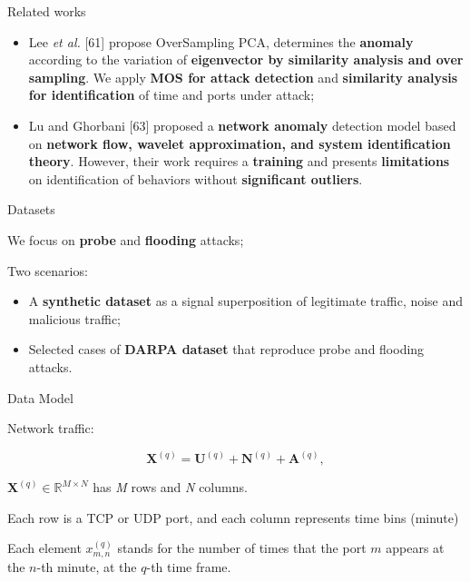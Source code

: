 \documentclass[newPxFont, numfooter, sectionpages]{beamer}
\begin{document}
\begin{frame}[c]{Related works}
	
	\begin{itemize}
		\item Lee \emph{et al.} [61] propose OverSampling PCA, determines the \textbf{anomaly} according to the variation of \textbf{eigenvector by similarity analysis and over sampling}. We apply \textbf{MOS for attack detection} and \textbf{similarity analysis for identification} of time and ports under attack;
		\item Lu and Ghorbani [63] proposed a \textbf{network anomaly} detection model based on \textbf{network flow, wavelet approximation, and system identification theory}. However, their work requires a \textbf{training} and presents \textbf{limitations} on identification of behaviors without \textbf{significant outliers}.
	\end{itemize}
	
\end{frame}
\begin{frame}{Datasets}
	
	We focus on \textbf{probe} and \textbf{flooding} attacks;

	Two scenarios: 
	\begin{itemize}
		\item A \textbf{synthetic dataset} as a signal superposition of legitimate traffic, noise and malicious traffic;
		\item Selected cases of \textbf{DARPA dataset} that reproduce probe and flooding attacks.
	\end{itemize}

\end{frame}
\begin{frame}{Data Model}
	
	Network traffic:

	\begin{equation}\label{eq:eq01}
		\boldsymbol{X}^{(q)} = \boldsymbol{U}^{(q)} + \boldsymbol{N}^{(q)} + \boldsymbol{A}^{(q)},
	\end{equation}

	$\boldsymbol{X}^{(q)} \in \mathbb{R}^{M \times N}$ has \emph{M} rows and \emph{N} columns. 

	Each row is a TCP or UDP port, and each column represents time bins (minute)

	Each element $x_{m,n}^{(q)}$ stands for the number of times that the port $m$ appears at the $n$-th minute, at the $q$-th time frame.

\end{frame}
\end{document}
